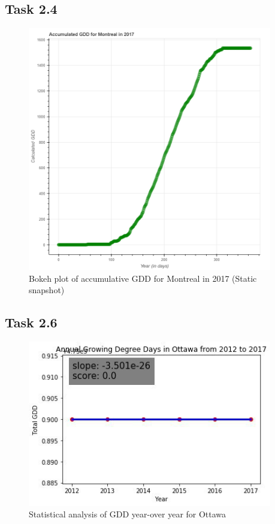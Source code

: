 \documentclass[12pt]{article}
\begin{document}
\pagebreak
\subsection{Task 2.4}
\begin{figure}[!htbp]
\centering
\includegraphics[width=0.95\textwidth]{./docs/bokeh_plot.png} 
\caption{\scriptsize Bokeh plot of accumulative GDD for Montreal in 2017 (Static snapshot)}
\label{bokeh}		  
\end{figure}

\pagebreak
\subsection{Task 2.6}
\begin{figure}[!htbp]
\centering
\includegraphics[width=0.95\textwidth]{./docs/LinearReg_Ottawa_2014_2017.png} 
\caption{\scriptsize Statistical analysis of GDD year-over year for Ottawa}
\label{GDDregression}		  
\end{figure}
\end{document}
